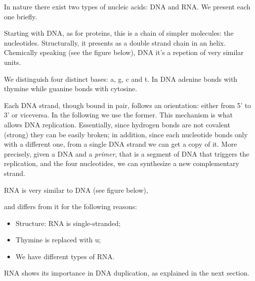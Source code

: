 \documentclass{subfiles}
\begin{document}
    In nature there exist two types of nucleic acids: DNA and RNA.
        We present each one briefly. 

    Starting with DNA, as for proteins, this is a chain of simpler molecules:
        the nucleotides. Structurally, it presents as a double strand chain in an helix.
        Chemically speaking (see the figure below), DNA it's a repetion of very similar units.
        

    \noindent We distinguish four distinct bases: \gls{a}, \gls{g}, \gls{c} and \gls{t}.
        In DNA adenine bonds with thymine while guanine bonds with cytosine.
        
    Each DNA strand, though bound in pair, follows an orientation: 
        either from 5' to 3' or viceversa. In the following we use the former.
        This mechanism is what allows DNA replication. Essentially, 
        since hydrogen bonds are not covalent (strong) they can be easily broken;
        in addition, since each nucleotide bonds only with a different one,
        from a single DNA strand we can get a copy of it.
        More precisely, given a DNA and a \emph{primer}, that is a segment of DNA that triggers the replication,
        and the four nucleotides, we can synthesize a new complementary strand.

    \clearpage
    RNA is very similar to DNA (see figure below), 
    
    and differs from it for the following reasons:
    \begin{itemize}
        \item Structure: RNA is single-stranded;
        \item Thymine is replaced with \gls{u};
        \item We have different types of RNA.
    \end{itemize}

    RNA shows its importance in DNA duplication, as explained in the next section.
\end{document}
